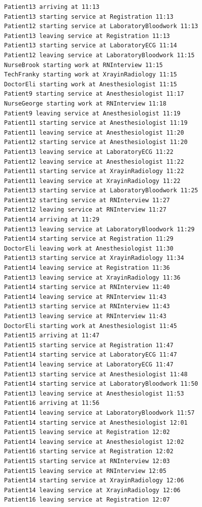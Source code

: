 \documentclass[12pt]{article}
\begin{document}
\begin{verbatim}
		Patient13 arriving at 11:13
		Patient13 starting service at Registration 11:13
		Patient12 starting service at LaboratoryBloodwork 11:13
		Patient13 leaving service at Registration 11:13
		Patient13 starting service at LaboratoryECG 11:14
		Patient12 leaving service at LaboratoryBloodwork 11:15
		NurseBrook starting work at RNInterview 11:15
		TechFranky starting work at XrayinRadiology 11:15
		DoctorEli starting work at Anesthesiologist 11:15
		Patient9 starting service at Anesthesiologist 11:17
		NurseGeorge starting work at RNInterview 11:18
		Patient9 leaving service at Anesthesiologist 11:19
		Patient11 starting service at Anesthesiologist 11:19
		Patient11 leaving service at Anesthesiologist 11:20
		Patient12 starting service at Anesthesiologist 11:20
		Patient13 leaving service at LaboratoryECG 11:22
		Patient12 leaving service at Anesthesiologist 11:22
		Patient11 starting service at XrayinRadiology 11:22
		Patient11 leaving service at XrayinRadiology 11:22
		Patient13 starting service at LaboratoryBloodwork 11:25
		Patient12 starting service at RNInterview 11:27
		Patient12 leaving service at RNInterview 11:27
		Patient14 arriving at 11:29
		Patient13 leaving service at LaboratoryBloodwork 11:29
		Patient14 starting service at Registration 11:29
		DoctorEli leaving work at Anesthesiologist 11:30
		Patient13 starting service at XrayinRadiology 11:34
		Patient14 leaving service at Registration 11:36
		Patient13 leaving service at XrayinRadiology 11:36
		Patient14 starting service at RNInterview 11:40
		Patient14 leaving service at RNInterview 11:43
		Patient13 starting service at RNInterview 11:43
		Patient13 leaving service at RNInterview 11:43
		DoctorEli starting work at Anesthesiologist 11:45
		Patient15 arriving at 11:47
		Patient15 starting service at Registration 11:47
		Patient14 starting service at LaboratoryECG 11:47
		Patient14 leaving service at LaboratoryECG 11:47
		Patient13 starting service at Anesthesiologist 11:48
		Patient14 starting service at LaboratoryBloodwork 11:50
		Patient13 leaving service at Anesthesiologist 11:53
		Patient16 arriving at 11:56
		Patient14 leaving service at LaboratoryBloodwork 11:57
		Patient14 starting service at Anesthesiologist 12:01
		Patient15 leaving service at Registration 12:02
		Patient14 leaving service at Anesthesiologist 12:02
		Patient16 starting service at Registration 12:02
		Patient15 starting service at RNInterview 12:03
		Patient15 leaving service at RNInterview 12:05
		Patient14 starting service at XrayinRadiology 12:06
		Patient14 leaving service at XrayinRadiology 12:06
		Patient16 leaving service at Registration 12:07

\end{verbatim}
\end{document}
